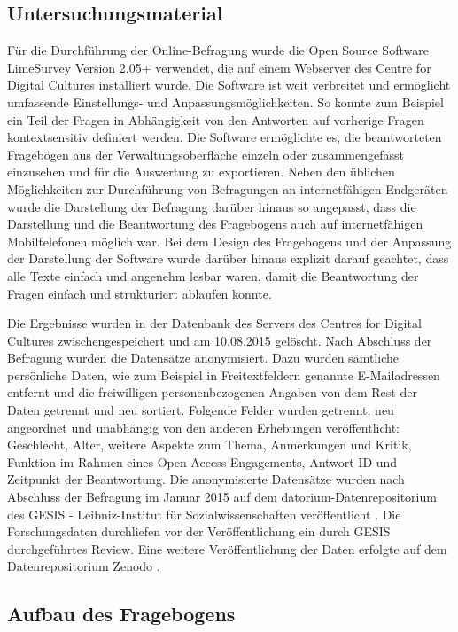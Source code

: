 \subsection{Untersuchungsmaterial}

Für die Durchführung der Online-Befragung wurde die Open Source Software LimeSurvey Version 2.05+ verwendet, die auf einem Webserver des Centre for Digital Cultures installiert wurde. Die Software ist weit verbreitet und ermöglicht umfassende Einstellungs- und Anpassungsmöglichkeiten. So konnte zum Beispiel ein Teil der Fragen in Abhängigkeit von den Antworten auf vorherige Fragen kontextsensitiv definiert werden. Die Software ermöglichte es, die beantworteten Fragebögen aus der Verwaltungsoberfläche einzeln oder zusammengefasst einzusehen und für die Auswertung zu exportieren. Neben den üblichen Möglichkeiten zur Durchführung von Befragungen an internetfähigen Endgeräten wurde die Darstellung der Befragung darüber hinaus so angepasst, dass die Darstellung und die Beantwortung des Fragebogens auch auf internetfähigen Mobiltelefonen möglich war. Bei dem Design des Fragebogens und der Anpassung der Darstellung der Software wurde darüber hinaus explizit darauf geachtet, dass alle Texte einfach und angenehm lesbar waren, damit die Beantwortung der Fragen einfach und strukturiert ablaufen konnte.

Die Ergebnisse wurden in der Datenbank des Servers des Centres for Digital Cultures zwischengespeichert und am 10.08.2015 gelöscht. Nach Abschluss der Befragung wurden die Datensätze anonymisiert. Dazu wurden sämtliche persönliche Daten, wie zum Beispiel in Freitextfeldern genannte E-Mailadressen entfernt und die freiwilligen personenbezogenen Angaben von dem Rest der Daten getrennt und neu sortiert. Folgende Felder wurden getrennt, neu angeordnet und unabhängig von den anderen Erhebungen veröffentlicht: Geschlecht, Alter, weitere Aspekte zum Thema, Anmerkungen und Kritik, Funktion im Rahmen eines Open Access Engagements, Antwort ID und Zeitpunkt der Beantwortung. Die anonymisierte Datensätze wurden nach Abschluss der Befragung im Januar 2015 auf dem datorium-Datenrepositorium des GESIS - Leibniz-Institut für Sozialwissenschaften veröffentlicht \cite{heise_2015_os_data_gesis}. Die Forschungsdaten durchliefen vor der Veröffentlichung ein durch GESIS durchgeführtes Review. Eine weitere Veröffentlichung der Daten erfolgte auf dem Datenrepositorium Zenodo \cite{heise_2015_os_data_zenodo}.

\subsection{Aufbau des Fragebogens}

